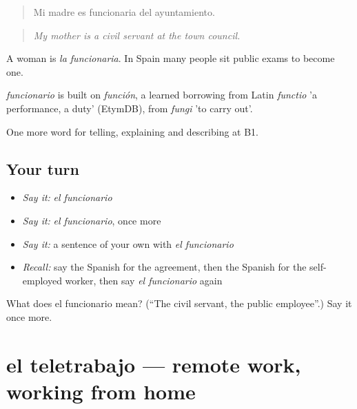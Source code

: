\begin{quote}
Mi madre es funcionaria del ayuntamiento.
\end{quote}

\begin{quote}
\emph{My mother is a civil servant at the town council.}
\end{quote}

A woman is \emph{la funcionaria}. In Spain many people sit public exams to become one.

\begin{cousinweb}
\emph{funcionario} is built on \emph{función}, a learned borrowing from Latin \emph{functio} 'a performance, a duty' (EtymDB), from \emph{fungi} 'to carry out'.
\end{cousinweb}

\begin{grammarlens}[title={What you've built}]
One more word for telling, explaining and describing at B1.
\end{grammarlens}

\subsection*{Your turn}
\begin{itemize}
\raggedright
  \item \emph{Say it:} \emph{el funcionario}
  \item \emph{Say it:} \emph{el funcionario}, once more
  \item \emph{Say it:} a sentence of your own with \emph{el funcionario}
  \item \emph{Recall:} say the Spanish for the agreement, then the Spanish for the self-employed worker, then say \emph{el funcionario} again
\end{itemize}

\begin{tcolorbox}[breakable,colback=teal!4,colframe=teal!35!black,title={Before you move on}]
What does el funcionario mean? (\textquotedblleft{}The civil servant, the public employee\textquotedblright{}.) Say it once more.
\end{tcolorbox}
\section[el teletrabajo]{el teletrabajo — remote work, working from home}

\label{lesson:ES-C591-teletrabajo}



